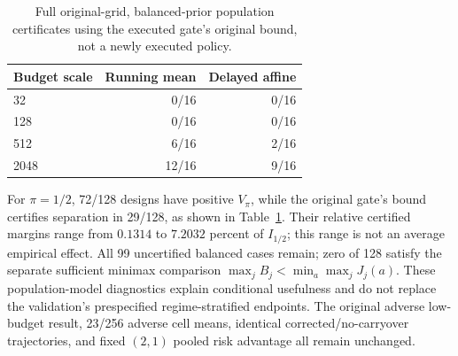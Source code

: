 \begin{table}[t]
\centering
\caption{Full original-grid, balanced-prior population certificates using the executed gate's original bound, not a newly executed policy.}
\label{tab:supp-fixed-catalogue}
\begin{tabular}{lrr}
\toprule
Budget scale & Running mean & Delayed affine\\
\midrule
32 & 0/16 & 0/16\\
128 & 0/16 & 0/16\\
512 & 6/16 & 2/16\\
2048 & 12/16 & 9/16\\
\bottomrule
\end{tabular}
\end{table}
For $\pi=1/2$, 72/128 designs have positive $V_\pi$, while the original gate's bound certifies separation in 29/128, as shown in Table~\ref{tab:supp-fixed-catalogue}.
Their relative certified margins range from $0.1314$ to $7.2032$ percent of $I_{1/2}$; this range is not an average empirical effect.
All 99 uncertified balanced cases remain; zero of 128 satisfy the separate sufficient minimax comparison $\max_jB_j<\min_a\max_jJ_j(a)$.
These population-model diagnostics explain conditional usefulness and do not replace the validation's prespecified regime-stratified endpoints.
The original adverse low-budget result, 23/256 adverse cell means, identical corrected/no-carryover trajectories, and fixed $(2,1)$ pooled risk advantage all remain unchanged.
